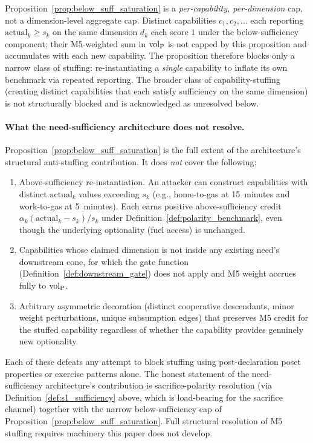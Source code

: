 \begin{remark}
\label{rem:pointwise_not_aggregate}
Proposition~\ref{prop:below_suff_saturation} is a
\emph{per-capability, per-dimension} cap, not a dimension-level
aggregate cap.  Distinct capabilities $c_1, c_2, \ldots$ each
reporting $\mathrm{actual}_k \geq s_k$ on the same dimension
$d_k$ each score $1$ under the below-sufficiency component;
their M5-weighted sum in ${\operatorname{vol}_{\mathrm{P}}}$ is not capped by this
proposition and accumulates with each new capability.  The
proposition therefore blocks only a narrow class of stuffing:
re-instantiating a \emph{single} capability to inflate its own
benchmark via repeated reporting.  The broader class of
capability-stuffing (creating distinct capabilities that each
satisfy sufficiency on the same dimension) is not structurally
blocked and is acknowledged as unresolved below.
\end{remark}

\paragraph{What the need-sufficiency architecture does not
resolve.}
Proposition~\ref{prop:below_suff_saturation} is the full extent
of the architecture's structural anti-stuffing contribution.  It
does \emph{not} cover the following:
\begin{enumerate}
\item[(i)] Above-sufficiency re-instantiation.  An attacker can
  construct capabilities with distinct
  $\mathrm{actual}_k$ values exceeding $s_k$ (e.g.,
  home-to-gas at 15~minutes and work-to-gas at 5~minutes).
  Each earns positive above-sufficiency credit
  $\alpha_k(\mathrm{actual}_k - s_k)/s_k$ under
  Definition~\ref{def:polarity_benchmark}, even though the
  underlying optionality (fuel access) is unchanged.
\item[(ii)] Capabilities whose claimed dimension is not inside
  any existing need's downstream cone, for which the gate
  function (Definition~\ref{def:downstream_gate}) does not
  apply and M5 weight accrues fully to ${\operatorname{vol}_{\mathrm{P}}}$.
\item[(iii)] Arbitrary asymmetric decoration (distinct
  cooperative descendants, minor weight perturbations, unique
  subsumption edges) that preserves M5 credit for the stuffed
  capability regardless of whether the capability provides
  genuinely new optionality.
\end{enumerate}
Each of these defeats any attempt to block stuffing using
post-declaration poset properties or exercise patterns alone.
The honest statement of the need-sufficiency architecture's
contribution is sacrifice-polarity resolution (via
Definition~\ref{def:s1_sufficiency} above, which is
load-bearing for the sacrifice channel) together with the
narrow below-sufficiency cap of
Proposition~\ref{prop:below_suff_saturation}.  Full structural
resolution of M5 stuffing requires machinery this paper does not
develop.

